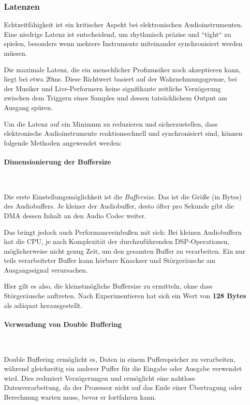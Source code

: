 \subsubsection{Latenzen}

Echtzeitfähigkeit ist ein kritischer Aspekt bei elektronischen Audioinstrumenten. 
Eine niedrige Latenz ist entscheidend, um rhythmisch präzise und ``tight`` zu spielen, besonders wenn mehrere Instrumente miteinander synchronisiert werden müssen.

Die maximale Latenz, die ein menschlicher Profimusiker noch akzeptieren kann, liegt bei etwa 20ms. Diese Richtwert basiert auf der Wahrnehmungsgrenze, bei der Musiker und Live-Performern keine signifikante zeitliche Verzögerung zwischen dem Triggern eines Samples und dessen tatsächlichem Output am Ausgang spüren. \cite{latency-experiment}

Um die Latenz auf ein Minimum zu reduzieren und sicherzustellen, dass elektronische Audioinstrumente reaktionsschnell und synchronisiert sind, können folgende Methoden angewendet werden:

\paragraph{Dimensionierung der Buffersize}\

Die erste Einstellungsmöglichkeit ist die \textit{Buffersize}.
Das ist die Größe (in Bytes) des Audiobuffers.
Je kleiner der Audiobuffer, desto öfter pro Sekunde gibt die DMA dessen Inhalt an den Audio Codec weiter.

Das bringt jedoch auch Performanceeinbußen mit sich: Bei kleinen Audiobuffern hat die CPU, je nach Komplexität der durchzuführenden DSP-Operationen, möglicherweise nicht genug Zeit, um den gesamten Buffer zu verarbeiten.
Ein nur teils verarbeiteter Buffer kann hörbare Knackser und Störgeräusche am Ausgangssignal verursachen.

Hier gilt es also, die kleinstmögliche Buffersize zu ermitteln, ohne dass Störgeräusche auftreten.
Nach Experimentieren hat sich ein Wert von \textbf{128 Bytes} als adäquat herausgestellt.

\paragraph{Verwendung von Double Buffering}\

Double Buffering ermöglicht es, Daten in einem Pufferspeicher zu verarbeiten, während gleichzeitig ein anderer Puffer für die Eingabe oder Ausgabe verwendet wird. Dies reduziert Verzögerungen und ermöglicht eine nahtlose Datenverarbeitung, da der Prozessor nicht auf das Ende einer Übertragung oder Berechnung warten muss, bevor er fortfahren kann. \cite{double-buffering}

